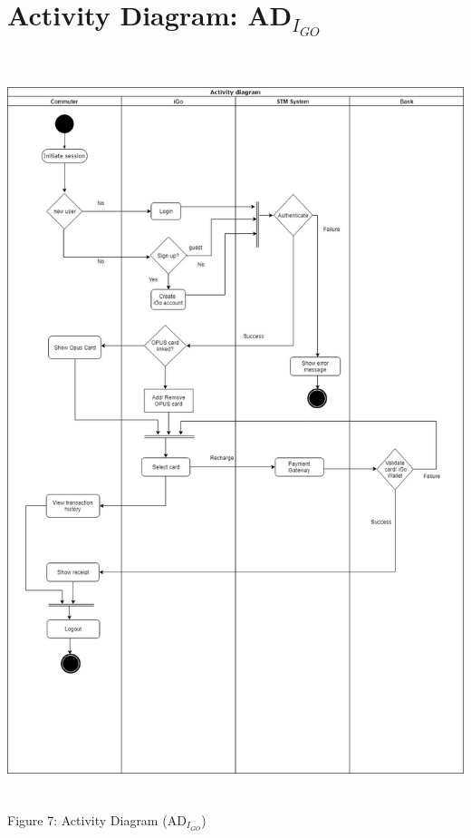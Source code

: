 \documentclass[a4paper, 11pt]{report}
\begin{document}
{\section{Activity Diagram: AD$_{I_{GO}}$}
 \includegraphics[width=161mm,height=220mm,scale=0.5]
 {Activity_Diagram.jpg}\\
\tab\tab\qquad\quad\qquad\qquad\qquad Figure 7: Activity Diagram (AD$_{I_{GO}}$)
}
\end{document}

